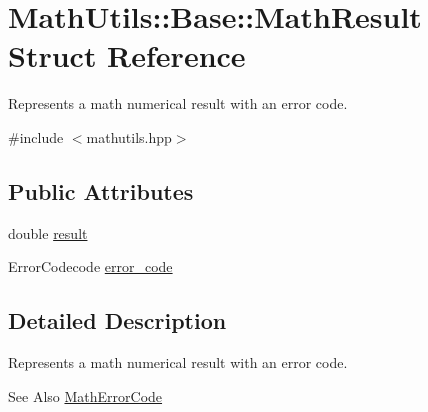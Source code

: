 \hypertarget{structMathUtils_1_1Base_1_1MathResult}{\section{Math\-Utils\-:\-:Base\-:\-:Math\-Result Struct Reference}
\label{structMathUtils_1_1Base_1_1MathResult}
}


Represents a math numerical result with an error code.  




{\ttfamily \#include $<$mathutils.\-hpp$>$}

\subsection*{Public Attributes}
\begin{DoxyCompactItemize}
\item 
double \hyperlink{structMathUtils_1_1Base_1_1MathResult_a34d7a174fdb6a8ace3fff2fa7d43ee05}{result}
\item 
Error\-Codecode \hyperlink{structMathUtils_1_1Base_1_1MathResult_a1100d7bbaef7f1aa1f0159605d751f5c}{error\-\_\-code}
\end{DoxyCompactItemize}


\subsection{Detailed Description}
Represents a math numerical result with an error code. 

\begin{DoxySeeAlso}{See Also}
\hyperlink{namespaceMathUtils_1_1Base_aac4088d82202217a0cea2b81ec0649a2}{Math\-Error\-Code} 
\end{DoxySeeAlso}


